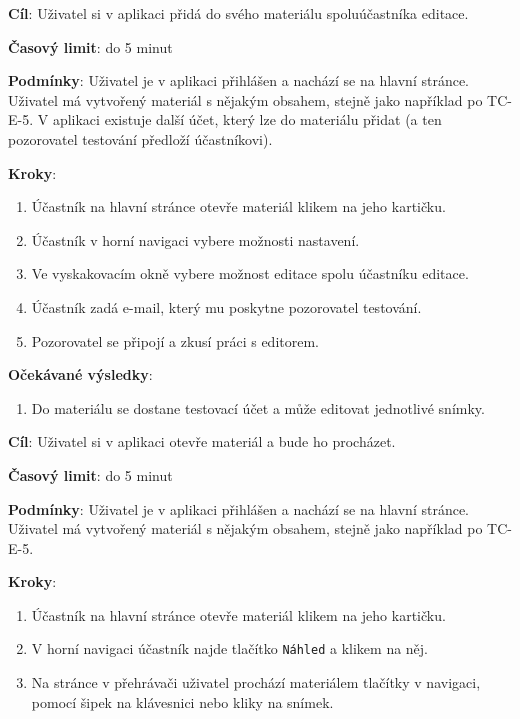 \vspace{1em}

\textbf{Cíl}: Uživatel si v aplikaci přidá do svého materiálu spoluúčastníka editace.

\textbf{Časový limit}: do 5 minut

\textbf{Podmínky}:  Uživatel je v aplikaci přihlášen a nachází se na hlavní stránce.  Uživatel má vytvořený materiál s nějakým obsahem, stejně jako například po TC-E-5. V aplikaci existuje další účet, který lze do materiálu přidat (a ten pozorovatel testování předloží účastníkovi).

\textbf{Kroky}:

\begin{enumerate}[leftmargin=1.4cm]
    \item Účastník na hlavní stránce otevře materiál klikem na jeho kartičku.
    \item Účastník v horní navigaci vybere možnosti nastavení.
    \item Ve vyskakovacím okně vybere možnost editace spolu účastníku editace.
    \item Účastník zadá e-mail, který mu poskytne pozorovatel testování.
    \item Pozorovatel se připojí a zkusí práci s editorem.
\end{enumerate}

\textbf{Očekávané výsledky}:

\begin{enumerate}[leftmargin=1.4cm]
    \item Do materiálu se dostane testovací účet a může editovat jednotlivé snímky.
\end{enumerate}






\vspace{1em}

\textbf{Cíl}: Uživatel si v aplikaci otevře materiál a bude ho procházet.

\textbf{Časový limit}: do 5 minut

\textbf{Podmínky}:  Uživatel je v aplikaci přihlášen a nachází se na hlavní stránce.  Uživatel má vytvořený materiál s nějakým obsahem, stejně jako například po TC-E-5.

\textbf{Kroky}:

\begin{enumerate}[leftmargin=1.4cm]
    \item Účastník na hlavní stránce otevře materiál klikem na jeho kartičku.
    \item V horní navigaci účastník najde tlačítko \verb|Náhled| a klikem na něj.
    \item Na stránce v přehrávači uživatel prochází materiálem tlačítky v navigaci, pomocí šipek na klávesnici nebo kliky na snímek.
\end{enumerate}

